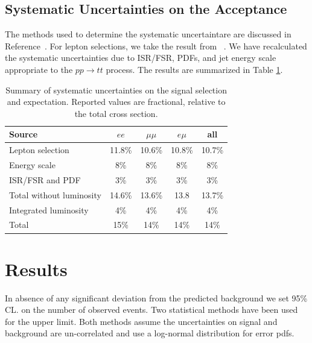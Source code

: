 
\subsection{Systematic Uncertainties on the Acceptance}
\label{sec:sssystematics}

The methods used to determine the systematic uncertaintare are discussed in Reference~\cite{ssnote1}.
For lepton selections, we take the result from ~\cite{ssnote1}.
We have recalculated the systematic uncertainties due to ISR/FSR, PDFs, and jet energy scale
appropriate to the $pp \to tt$ process.  The results are 
summarized 
in Table \ref{tab:systSumm}.

\begin{table}[h]
\begin{center}
\begin{tabular}{lcccc}\hline
Source 					& $ee$		& $\mu\mu$		& $e\mu$			& all \\ \hline
Lepton selection			& 11.8\%		& 10.6\%		& 10.8\%			& 10.7\% \\
Energy scale				& 8\%		& 8\%		& 8\%			& 8\% \\
ISR/FSR and PDF				& 3\%		& 3\%		& 3\%			& 3\% 	\\
Total without luminosity		& 14.6\%		& 13.6\%		& 13.8	& 13.7\%	\\ \hline
Integrated luminosity			& 4\%		& 4\%		& 4\%			& 4\%	\\ \hline
Total & 15\% & 14\% & 14\%  & 14\% \\
\hline
\end{tabular}
\caption{\small\label{tab:systSumm}Summary of systematic uncertainties on the signal selection and
expectation. Reported values are fractional, relative to the total cross section.}
\end{center}
\end{table}

\section{Results}
\label{sec:ssresults}

In absence of any significant deviation from the predicted background we set 95\% CL. on the number of observed events. 
Two statistical methods have been used for the upper limit. 
Both methods assume the uncertainties on signal and background are un-correlated and use a log-normal distribution for error pdfs. 

